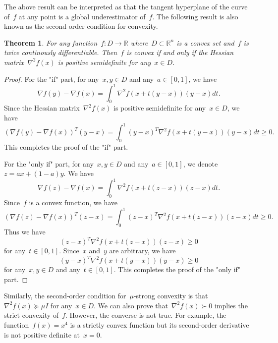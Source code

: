 \documentclass[12pt,a4paper,draft]{article}  %
\newtheorem{theorem}{Theorem}[section]
\theoremstyle{definition}
\numberwithin{equation}{section}
\newcommand{\RR}{\mathbb{R}}
\begin{document}
The above result can be interpreted as that the tangent hyperplane of the curve of~$f$ at any point is a global underestimator of~$f$.
The following result is also known as the second-order condition for convexity.
\begin{theorem}
    For any function~$f: D \to \RR$ where~$D \subset \RR^n$ is a convex set and~$f$ is twice continously differentiable.
    Then~$f$ is convex if and only if the Hessian matrix~$\nabla^2 f(x)$ is positive semidefinite for any~$x \in D$.
\end{theorem}
\begin{proof}
    For the "if" part, for any~$x,y \in D$ and any~$a \in \left[ 0,1 \right]$, we have
    \[
    \nabla f(y) - \nabla f(x) = \int_{0}^{1} \nabla^2 f(x+t(y-x)) (y-x) dt.
    \]
    Since the Hessian matrix~$\nabla^2 f(x)$ is positive semidefinite for any~$x \in D$, we have
    \[
    (\nabla f(y) - \nabla f(x))^T (y-x) = \int_{0}^{1} (y-x)^T \nabla^2 f(x+t(y-x)) (y-x) dt \geq 0.
    \]
    This completes the proof of the "if" part.

    For the "only if" part, for any~$x,y \in D$ and any~$a \in \left[ 0,1 \right]$, we denote~$z=ax+(1-a)y$.
    We have
    \[ \nabla f(z) - \nabla f(x) = \int_{0}^{1} \nabla^2 f(x+t(z-x)) (z-x) dt. \]
    Since~$f$ is a convex function, we have
    \[ (\nabla f(z) - \nabla f(x))^T (z-x) = \int_{0}^{1} (z-x)^T \nabla^2 f(x+t(z-x)) (z-x) dt \geq 0. \]
    Thus we have
    \[ (z-x)^T \nabla^2 f(x+t(z-x)) (z-x) \geq 0 \]
    for any~$t \in [0,1]$. Since~$x$ and~$y$ are arbitrary, we have
    \[ (y-x)^T \nabla^2 f(x+t(y-x)) (y-x) \geq 0 \]
    for any~$x,y \in D$ and any~$t \in [0,1]$. This completes the proof of the "only if" part.
\end{proof}
Similarly, the second-order condition for~$\mu$-strong convexity is that~$\nabla^2 f(x) \succeq \mu I$ for any~$x \in D$.
We can also prove that~$\nabla^2 f(x) \succ  0$ implies the strict convexity of~$f$. However, the converse is not true. For example, the function~$f(x) = x^4$ is a strictly convex function but its second-order derivative is not positive definite at~$x=0$.
\end{document}
